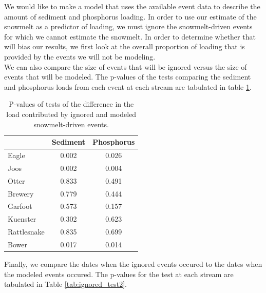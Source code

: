\documentclass[10pt]{article}
\begin{document}
We would like to make a model that uses the available event data to describe the amount of sediment and phosphorus loading. In order to use our estimate of the snowmelt as a predictor of loading, we must ignore the snowmelt-driven events for which we cannot estimate the snowmelt. In order to determine whether that will bias our results, we first look at the overall proportion of loading that is provided by the events we will not be modeling.\\


We can also compare the size of events that will be ignored versus the size of events that will be modeled. The p-values of the tests comparing the sediment and phosphorus loads from each event at each stream are tabulated in table \ref{tab:ignored_test1}.\\

\begin{table}[ht]
\begin{center}
\begin{tabular}{lcc}
  & Sediment & Phosphorus \\ 
  \hline
Eagle & 0.002 & 0.026 \\ 
  Joos & 0.002 & 0.004 \\ 
  Otter & 0.833 & 0.491 \\ 
  Brewery & 0.779 & 0.444 \\ 
  Garfoot & 0.573 & 0.157 \\ 
  Kuenster & 0.302 & 0.623 \\ 
  Rattlesnake & 0.835 & 0.699 \\ 
  Bower & 0.017 & 0.014 \\ 
  \end{tabular}
\caption{P-values of tests of the difference in the load contributed by ignored and modeled snowmelt-driven events.}
\label{tab:ignored_test1}
\end{center}
\end{table}
Finally, we compare the dates when the ignored events occured to the dates when the modeled events occured. The p-values for the test at each stream are tabulated in Table \ref{tab:ignored_test2}.\\
\end{document}
